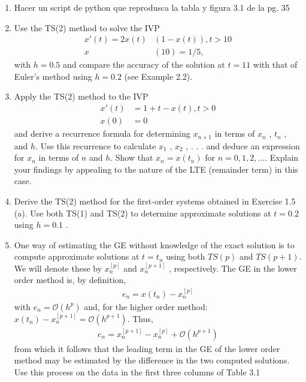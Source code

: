 
\newpage
\begin{enumerate}
	\item
	Hacer un script de python que reprodusca la tabla y figura 3.1 de la pg. 35
	\item	
		Use the TS(2) method to solve the IVP
		\begin{align*}
			x'(t) = 2x(t)&(1 - x(t)) , t>10 \\
			x&(10) = 1/5,
		\end{align*}
		with $h = 0.5$ and compare the accuracy of the solution at $t = 11$
		with that of Euler’s method using $h = 0.2$ (see Example 2.2).
	\item
		Apply the TS(2) method to the IVP \\
		\begin{align*}
			x'(t) &= 1 + t - x(t) , t>0 \\
			x(0) &= 0
		\end{align*}
		and derive a recurrence formula for determining $x_{n+1}$ in terms of
		$x_n$ , $t_n$ , and $h$. Use this recurrence to calculate $x_1$ , $x_2$ , . . . 
		and deduce an expression for $x_n$ in terms of $n$ and $h$. Show that $x_n = x(t_n )$ for $n = 0, 1, 2, . . . .$ Explain your findings by appealing to the nature of
		the LTE (remainder term) in this case.
	\item
		Derive the TS(2) method for the first-order systems obtained in Exercise 1.5 (a). 
		Use both TS(1) and TS(2) to determine approximate solutions at $t = 0.2$ using $h = 0.1$ .
	\item
		One way of estimating the GE without knowledge of the exact solution is to compute approximate solutions at $t = t_n$ using both $TS(p)$ and $TS(p + 1)$. We will denote these by $x_n^{[p]}$ and $x_n^{[p + 1]}$ , respectively.
		The GE in the lower order method is, by definition,\\
		\begin{align*}
			e_n = x(t_n) - x_n^{[p]}
		\end{align*}
			with $e_n = \mathcal{O}(h^p)$ and, for the higher order method: $x(t_n) - x_n^{[p + 1]} = \mathcal{O}(h^{p + 1})$. Thus,
		\begin{align*}
			e_n = x_n^{[p+1]} - x_n^{[p]} + \mathcal{O}(h^{p + 1})
		\end{align*}
		from which it follows that the leading term in the GE of the lower order method may be estimated by the difference in the two computed solutions.\\
		Use this process on the data in the first three columns of Table 3.1

\end{enumerate}
